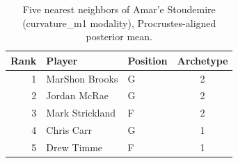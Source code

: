 \begin{table}[htbp]
  \centering\small
  \begin{tabular}{rllc}
    \toprule
    Rank & Player & Position & Archetype \\
    \midrule
    1 & MarShon Brooks & G & 2 \\
    2 & Jordan McRae & G & 2 \\
    3 & Mark Strickland & F & 2 \\
    4 & Chris Carr & G & 1 \\
    5 & Drew Timme & F & 1 \\
    \bottomrule
  \end{tabular}
  \caption{Five nearest neighbors of Amar'e Stoudemire (curvature_m1 modality), Procrustes-aligned posterior mean.}
  \label{tab:Amar_e_Stoudemire_neighbors_curvature_m1}
\end{table}

